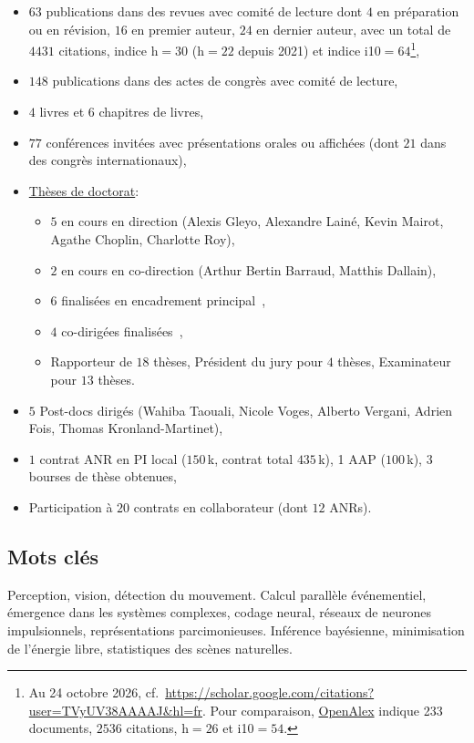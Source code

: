 \documentclass[10pt,french,a4paper,oneside]{article}%
\begin{document}
\begin{itemize}

\item	$63$ publications dans des revues avec comité de lecture dont $4$ en préparation ou en révision, $16$ en premier auteur, $24$ en dernier auteur, avec un total de $4431$ citations, indice h$=30$ (h$=22$ depuis 2021) et indice i10$=64$\footnote{Au 24 octobre 2026, cf.~\url{https://scholar.google.com/citations?user=TVyUV38AAAAJ&hl=fr}. Pour comparaison, \href{https://openalex.org/authors/A5010769763}{OpenAlex} indique 233 documents, $2536$ citations, h$=26$ et i10$=54$.},
\item	$148$ publications dans des actes de congrès avec comité de lecture,
\item	$4$ livres et $6$ chapitres de livres,
\item	$77$ conférences invitées avec présentations orales
ou affichées (dont $21$ dans des congrès internationaux),
\item \href{https://www.theses.fr/074493701}{Thèses de doctorat}:
\begin{itemize}
	\item $5$ en cours en direction (Alexis Gleyo, Alexandre Lainé, Kevin Mairot, Agathe Choplin, Charlotte Roy),
	\item $2$ en cours en co-direction (Arthur Bertin Barraud, Matthis Dallain),
	\item $6$ finalisées en encadrement principal~\citep{Khoei14thesis,Boutin20thesis,Franciosini21thesis,Ladret24thesis,Grimaldi24thesis,Jeremie25thesis},
	\item $4$ co-dirigées finalisées~\citep{Kremkow09thesis,Damasse18thesis,MansourPour19thesis,Gruel23thesis},
	\item Rapporteur de $18$ thèses, Président du jury pour $4$ thèses, Examinateur pour $13$ thèses.
\end{itemize} %
\item $5$ Post-docs dirigés (Wahiba Taouali, Nicole Voges, Alberto Vergani, Adrien Fois, Thomas Kronland-Martinet),
\item $1$ contrat ANR en PI local ($150$\,k\texteuro{}, contrat total $435$\,k\texteuro{}), 1 AAP ($100$\,k\texteuro{}), $3$ bourses de thèse obtenues,
\item Participation à $20$ contrats en collaborateur (dont $12$ ANRs).

\end{itemize} %

\subsection*{Mots clés}
Perception, vision, détection du mouvement. Calcul parallèle événementiel, émergence dans les systèmes complexes, codage neural, réseaux de neurones impulsionnels, représentations parcimonieuses. Inférence bayésienne, minimisation de l'énergie libre, statistiques des scènes naturelles.
\end{document}
